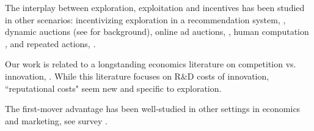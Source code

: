 \documentclass[../competing_bandits_with_appendix.tex]{subfiles}
\begin{document}
The interplay between exploration, exploitation and incentives has been studied in other scenarios: incentivizing exploration in a recommendation system,
    \eg \cite{Kremer-JPE14,Frazier-ec14,Che-13,ICexploration-ec15,Bimpikis-exploration-ms17},
dynamic auctions
    (see \cite{DynAuctions-survey10} for background),
online ad auctions, \eg
    \cite{MechMAB-ec09,DevanurK09,NSV08,Transform-ec10-jacm},
human computation
    \cite{RepeatedPA-ec14,Ghosh-itcs13,Krause-www13},
and repeated actions, \eg
    \cite{Amin-auctions-nips13,Amin-auctions-nips14,Jieming-ec18}.


Our work is related to a longstanding economics literature on competition vs. innovation, \eg \cite{Schumpeter-42,barro2004economic,Aghion-QJE05}. While this literature focuses on R\&D costs of innovation, ``reputational costs" seem new and specific to exploration.



The first-mover advantage has been well-studied in other settings in economics and marketing, see survey \cite{kerin1992first}.
\end{document}
